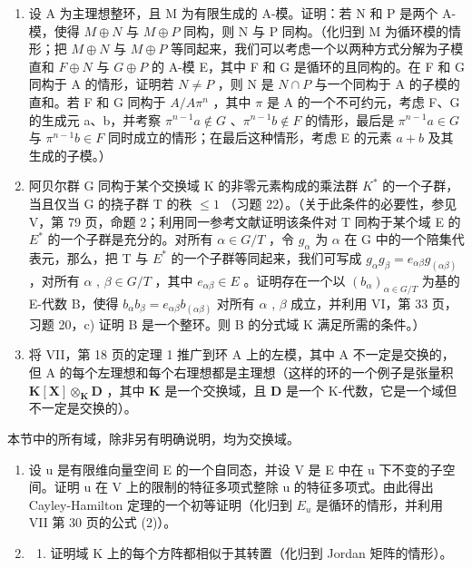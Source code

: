 \begin{enumerate}
\def\labelenumi{\arabic{enumi})}
\setcounter{enumi}{22}
\item
  设 A 为主理想整环，且 M 为有限生成的 A-模。证明：若 N 和 P 是两个 A-模，使得 \(M \oplus N\) 与 \(M \oplus P\) 同构，则 N 与 P 同构。（化归到 M 为循环模的情形；把 \(M \oplus N\) 与 \(M \oplus P\) 等同起来，我们可以考虑一个以两种方式分解为子模直和 \(F \oplus N\) 与 \(G \oplus P\) 的 A-模 E，其中 F 和 G 是循环的且同构的。在 F 和 G 同构于 A 的情形，证明若 \(N \neq P\) ，则 N 是 \(N \cap P\) 与一个同构于 A 的子模的直和。若 F 和 G 同构于 \(A/A\pi^{n}\) ，其中 \(\pi\) 是 A 的一个不可约元，考虑 F、G 的生成元 a、b，并考察 \(\pi^{n-1}a \notin G\) 、\(\pi^{n-1}b \notin F\) 的情形，最后是 \(\pi^{n-1}a \in G\) 与 \(\pi^{n-1}b \in F\) 同时成立的情形；在最后这种情形，考虑 E 的元素 \(a + b\) 及其生成的子模。）
\item
  阿贝尔群 G 同构于某个交换域 K 的非零元素构成的乘法群 \(K^{*}\) 的一个子群，当且仅当 G 的挠子群 T 的秩 \(\leqslant 1\) （习题 22）。（关于此条件的必要性，参见 V，第 79 页，命题 2；利用同一参考文献证明该条件对 T 同构于某个域 E 的 \(E^{*}\) 的一个子群是充分的。对所有 \(\alpha \in G/T\) ，令 \(g_{\alpha}\) 为 \(\alpha\) 在 G 中的一个陪集代表元，那么，把 T 与 \(E^{*}\) 的一个子群等同起来，我们可写成 \(g_{\alpha}g_{\beta} = e_{\alpha\beta}g_{(\alpha\beta)}\) ，对所有 \(\alpha\) , \(\beta \in G/T\) ，其中 \(e_{\alpha\beta} \in E\) 。证明存在一个以 \((b_{\alpha})_{\alpha \in G/T}\) 为基的 E-代数 B，使得 \(b_{\alpha}b_{\beta} = e_{\alpha\beta}b_{(\alpha\beta)}\) 对所有 \(\alpha\) , \(\beta\) 成立，并利用 VI，第 33 页，习题 20，c) 证明 B 是一个整环。则 B 的分式域 K 满足所需的条件。）
\item
  将 VII，第 18 页的定理 1 推广到环 A 上的左模，其中 A 不一定是交换的，但 A 的每个左理想和每个右理想都是主理想（这样的环的一个例子是张量积 \(\mathbf{K}[\mathbf{X}] \otimes_{\mathbf{K}} \mathbf{D}\) ，其中 \(\mathbf{K}\) 是一个交换域，且 \(\mathbf{D}\) 是一个 K-代数，它是一个域但不一定是交换的）。
\end{enumerate}

\BourbakiExerciseGroup

本节中的所有域，除非另有明确说明，均为交换域。

\begin{enumerate}
\def\labelenumi{\arabic{enumi})}
\item
  设 u 是有限维向量空间 E 的一个自同态，并设 V 是 E 中在 u 下不变的子空间。证明 u 在 V 上的限制的特征多项式整除 u 的特征多项式。由此得出 Cayley-Hamilton 定理的一个初等证明（化归到 \(E_{u}\) 是循环的情形，并利用 VII 第 30 页的公式 (2)）。
\item
  \begin{enumerate}
  \def\labelenumii{\alph{enumii})}
  \tightlist
  \item
    证明域 K 上的每个方阵都相似于其转置（化归到 Jordan 矩阵的情形）。
  \end{enumerate}
\end{enumerate}

